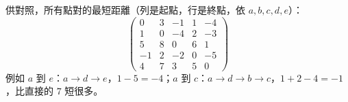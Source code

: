 \begin{pastsoln}
供對照，所有點對的最短距離（列是起點，行是終點，依 $a, b, c, d, e$）：
\[
\begin{pmatrix}
0 & 3 & -1 & 1 & -4 \\
1 & 0 & -4 & 2 & -3 \\
5 & 8 & 0 & 6 & 1 \\
-1 & 2 & -2 & 0 & -5 \\
4 & 7 & 3 & 5 & 0
\end{pmatrix}
\]
例如 $a$ 到 $e$：$a \to d \to e$，$1 - 5 = -4$；$a$ 到 $c$：$a \to d \to b \to c$，$1 + 2 - 4 = -1$，比直接的 $7$ 短很多。
\end{pastsoln}
